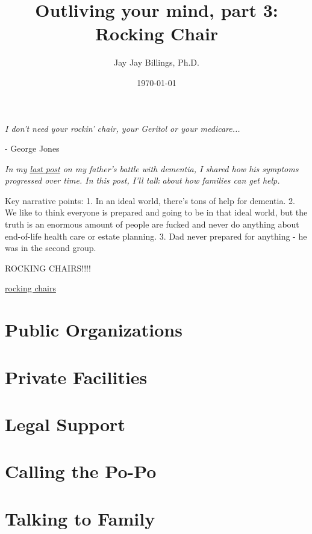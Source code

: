 \documentclass{article}
\title{Outliving your mind, part 3: Rocking Chair}
\author{Jay Jay Billings, Ph.D.}
\date{\today}
\begin{document}
\maketitle

\begin{center}
\textit{I don't need your rockin' chair, your Geritol or your medicare...}

\hspace*{\fill} - George Jones
\end{center}

\textit{In my \href{https://jayjaybillings.com/2023/07/06/outliving-your-mind-part-1-the-secret/}{last post} on my father's battle with dementia, I shared how his symptoms progressed over time. In this post, I'll talk about how families can get help.}

Key narrative points:
1. In an ideal world, there's tons of help for dementia.
2. We like to think everyone is prepared and going to be in that ideal world, but the truth is an enormous amount of people are fucked and never do anything about end-of-life health care or estate planning.
3. Dad never prepared for anything - he was in the second group.

ROCKING CHAIRS!!!!

\href{https://jayjaybillings.com/2016/08/18/family-rocking-chairs/s}{rocking chairs}

\section*{Public Organizations}

\section*{Private Facilities}

\section*{Legal Support}

\section*{Calling the Po-Po}

\section*{Talking to Family}
\end{document}

